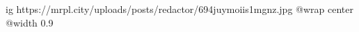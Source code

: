  
 
 
 
 

\ifcmt
  ig https://mrpl.city/uploads/posts/redactor/694juymoiis1mgnz.jpg
  @wrap center
  @width 0.9
\fi
